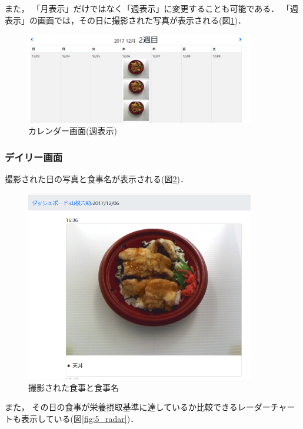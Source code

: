 \documentclass[../report]{subfiles}
\begin{document}
また， 「月表示」だけではなく「週表示」に変更することも可能である．
「週表示」の画面では，その日に撮影された写真が表示される(図\ref{fig:5_calendar-week})．

\begin{figure}[htbp]
    \begin{center}
        \includegraphics[width=10cm]{imgs/5_week.png}
        \caption{カレンダー画面(週表示)}
        \label{fig:5_calendar-week}
    \end{center}
\end{figure}

\subsubsection{デイリー画面}
撮影された日の写真と食事名が表示される(図\ref{fig:5_meal})．

\begin{figure}[htbp]
    \begin{center}
        \includegraphics[width=10cm]{imgs/5_day1.png}
        \caption{撮影された食事と食事名}
        \label{fig:5_meal}
    \end{center}
\end{figure}

また， その日の食事が栄養摂取基準に達しているか比較できるレーダーチャートも表示している(図\ref{fig:5_radar})．
\end{document}
